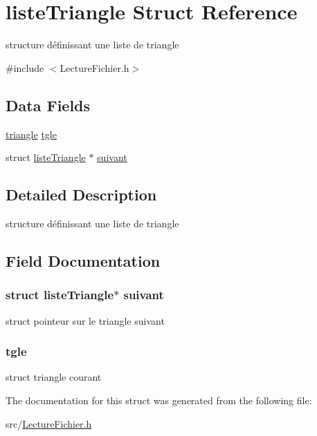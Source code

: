 \hypertarget{structliste_triangle}{
\section{listeTriangle Struct Reference}
\label{structliste_triangle}
}


structure définissant une liste de triangle  




{\ttfamily \#include $<$LectureFichier.h$>$}

\subsection*{Data Fields}
\begin{DoxyCompactItemize}
\item 
\hyperlink{structtriangle}{triangle} \hyperlink{structliste_triangle_a7dab36ef1c0c7857351043cbd4fc8e10}{tgle}
\item 
struct \hyperlink{structliste_triangle}{listeTriangle} $\ast$ \hyperlink{structliste_triangle_aedd11e799625058713f3922517d18941}{suivant}
\end{DoxyCompactItemize}


\subsection{Detailed Description}
structure définissant une liste de triangle 

\subsection{Field Documentation}
\hypertarget{structliste_triangle_aedd11e799625058713f3922517d18941}{
\subsubsection[{suivant}]{\setlength{\rightskip}{0pt plus 5cm}struct {\bf listeTriangle}$\ast$ {\bf suivant}}}
\label{structliste_triangle_aedd11e799625058713f3922517d18941}
struct pointeur sur le triangle suivant \hypertarget{structliste_triangle_a7dab36ef1c0c7857351043cbd4fc8e10}{
\subsubsection[{tgle}]{ {\bf tgle}}}
\label{structliste_triangle_a7dab36ef1c0c7857351043cbd4fc8e10}
struct triangle courant 

The documentation for this struct was generated from the following file:\begin{DoxyCompactItemize}
\item 
src/\hyperlink{_lecture_fichier_8h}{LectureFichier.h}\end{DoxyCompactItemize}

